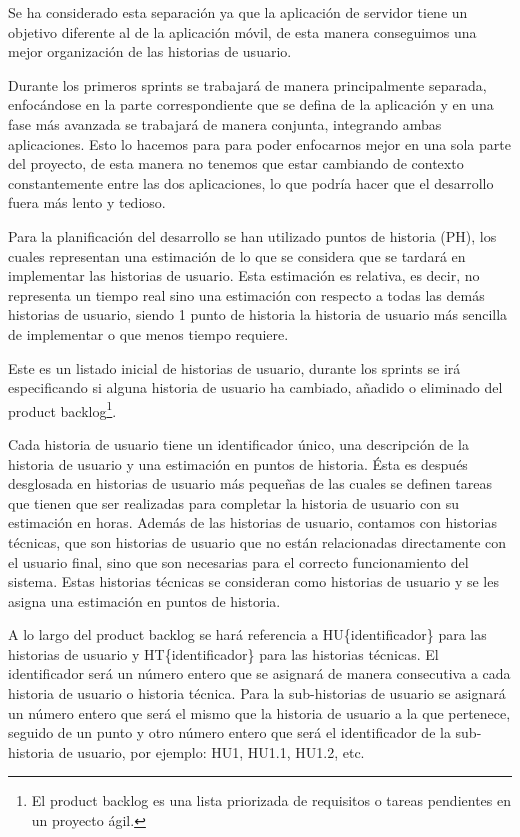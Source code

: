 Se ha considerado esta separación ya que la aplicación de servidor tiene un objetivo diferente al de la aplicación móvil, de esta manera conseguimos una mejor organización de las historias de usuario.

Durante los primeros sprints se trabajará de manera principalmente separada, enfocándose en la parte correspondiente que se defina de la aplicación y en una fase más avanzada se trabajará de manera conjunta, integrando ambas aplicaciones. Esto lo hacemos para para poder enfocarnos mejor en una sola parte del proyecto, de esta manera no tenemos que estar cambiando de contexto constantemente entre las dos aplicaciones, lo que podría hacer que el desarrollo fuera más lento y tedioso.

Para la planificación del desarrollo se han utilizado puntos de historia (PH), los cuales representan una estimación de lo que se considera que se tardará en implementar las historias de usuario. Esta estimación es relativa, es decir, no representa un tiempo real sino una estimación con respecto a todas las demás historias de usuario, siendo 1 punto de historia la historia de usuario más sencilla de implementar o que menos tiempo requiere.

Este es un listado inicial de historias de usuario, durante los sprints se irá especificando si alguna historia de usuario ha cambiado, añadido o eliminado del product backlog\footnote{El product backlog es una lista priorizada de requisitos o tareas pendientes en un proyecto ágil.}.

Cada historia de usuario tiene un identificador único, una descripción de la historia de usuario y una estimación en puntos de historia. Ésta es después desglosada en historias de usuario más pequeñas de las cuales se definen tareas que tienen que ser realizadas para completar la historia de usuario con su estimación en horas.
Además de las historias de usuario, contamos con historias técnicas, que son historias de usuario que no están relacionadas directamente con el usuario final, sino que son necesarias para el correcto funcionamiento del sistema. Estas historias técnicas se consideran como historias de usuario y se les asigna una estimación en puntos de historia.

A lo largo del product backlog  se hará referencia a HU\{identificador\} para las historias de usuario y HT\{identificador\} para las historias técnicas. El identificador será un número entero que se asignará de manera consecutiva a cada historia de usuario o historia técnica. Para la sub-historias de usuario se asignará un número entero que será el mismo que la historia de usuario a la que pertenece, seguido de un punto y otro número entero que será el identificador de la sub-historia de usuario, por ejemplo: HU1, HU1.1, HU1.2, etc.

